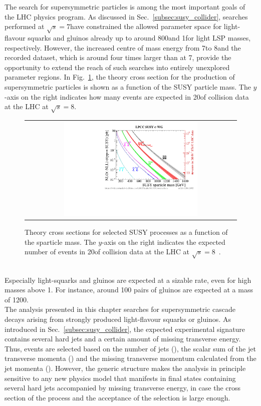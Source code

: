 The search for supersymmetric particles is among the most important goals of the LHC physics program. As discussed in Sec.~\ref{subsec:susy_collider}, searches performed at $\sqrt{s} = 7$\tev have constrained the allowed parameter space for light-flavour squarks and gluinos already up to around 800\gev and 1\tev for light LSP masses, respectively. However, the increased centre of mass energy from 7\tev to 8\tev and the recorded dataset, which is around four times larger than at 7\tev, provide the opportunity to extend the reach of such searches into entirely unexplored parameter regions. In Fig.~\ref{fig:susy_theory_xs}, the theory cross section for the production of supersymmetric particles is shown as a function of the SUSY particle mass. The $y$-axis on the right indicates how many events are expected in 20\fbinv of \pp collision data at the LHC at $\sqrt{s}=8$\tev. 
\begin{figure}[!h]
  \centering
  \begin{tabular}{c}
                \includegraphics[width=0.65\textwidth]{figures/xsections_strong.pdf} 
  \end{tabular}
  \caption{Theory cross sections for selected SUSY processes as a function of the sparticle mass. The $y$-axis on the right indicates the expected number of events in 20\fbinv of \pp collision data at the LHC at $\sqrt{s}=8$\tev~\cite{Kramer:2012bx}.}
  \label{fig:susy_theory_xs}
\end{figure}
\\
Especially light-squarks and gluinos are expected at a sizable rate, even for high masses above 1\tev. For instance, around 100 pairs of gluinos are expected at a mass of 1200\gev. \\
The analysis presented in this chapter searches for supersymmetric cascade decays arising from strongly produced light-flavour squarks or gluinos. As introduced in Sec.~\ref{subsec:susy_collider}, the expected experimental signature contains several hard jets and a certain amount of missing transverse energy. Thus, events are selected based on the number of jets (\NJets), the scalar sum of the jet transverse momenta (\HT) and the missing transverse momentum calculated from the jet momenta (\MHT). However, the generic structure makes the analysis in principle sensitive to any new physics model that manifests in final states containing several hard jets accompanied by missing transverse energy, in case the cross section of the process and the acceptance of the selection is large enough. \\
